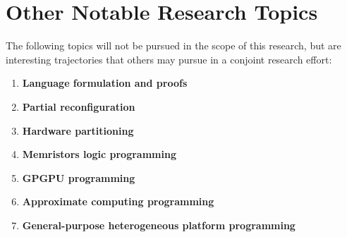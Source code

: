 \chapter{Other Notable Research Topics}
\label{chap:future_research}

The following topics will not be pursued in the scope of this research, but are interesting trajectories that others may pursue in a conjoint research effort:
\begin{enumerate}
	\item \textbf{Language formulation and proofs}\quad 
	\item \textbf{Partial reconfiguration}\quad 
	\item \textbf{Hardware partitioning}\quad 
	\item \textbf{Memristors logic programming}\quad 
	\item \textbf{GPGPU programming}\quad 
	\item \textbf{Approximate computing programming}\quad 
	\item \textbf{General-purpose heterogeneous platform programming}\quad 
\end{enumerate}
